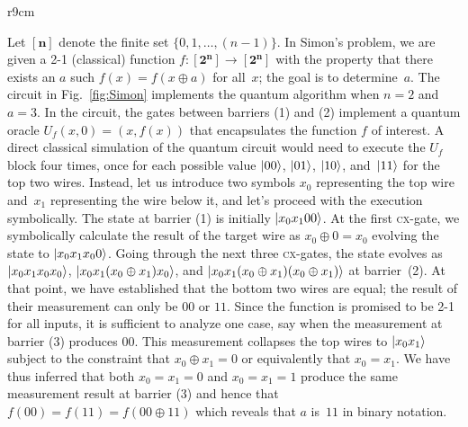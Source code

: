 \documentclass{article}
\newcommand{\cx}{\textsc{cx}}
\newcommand{\finset}[1]{[\mathbf{#1}]}
\begin{document}
\begin{refsection}
\begin{wrapfigure}{r}{9cm}
\caption{\label{fig:Simon}Circuit for Simon's Algorithm $n=2$ and $a=3$}
\end{wrapfigure}
Let $\finset{n}$ denote the finite set $\{ 0,1,\ldots,(n-1)\}$. In
Simon's problem, we are given a 2-1 (classical) function $f :
\finset{2^n} \rightarrow \finset{2^n}$ with the property that there
exists an $a$ such $f(x) = f(x \oplus a)$ for all~$x$; the goal is to
determine~$a$. The circuit in Fig.~\ref{fig:Simon} implements the
quantum algorithm when $n=2$ and $a = 3$. In the circuit, the gates
between barriers (1) and (2) implement a quantum oracle $U_f(x,0) =
(x,f(x))$ that encapsulates the function $f$ of interest. A direct
classical simulation of the quantum circuit would need to execute the
$U_f$ block four times, once for each possible value $\ket{00}$,
$\ket{01}$, $\ket{10}$, and~$\ket{11}$ for the top two wires. Instead,
let us introduce two symbols $x_0$ representing the top wire and~$x_1$
representing the wire below it, and let's proceed with the execution
symbolically. The state at barrier (1) is initially
$\ket{x_0x_100}$. At the first \cx-gate, we symbolically calculate the
result of the target wire as $x_0 \oplus 0 = x_0$ evolving the state
to $\ket{x_0x_1x_00}$. Going through the next three \cx-gates, the
state evolves as $\ket{x_0x_1x_0x_0}$, $\ket{x_0x_1(x_0\oplus
  x_1)x_0}$, and $\ket{x_0x_1(x_0\oplus x_1)(x_0\oplus x_1)}$ at
barrier~(2). At that point, we have established that the bottom two
wires are equal; the result of their measurement can only be $00$ or
$11$. Since the function is promised to be 2-1 for all inputs, it is
sufficient to analyze one case, say when the measurement at barrier
(3) produces $00$. This measurement collapses the top wires to
$\ket{x_0x_1}$ subject to the constraint that $x_0\oplus x_1 = 0$ or
equivalently that $x_0 = x_1$.  We have thus inferred that both
$x_0=x_1=0$ and $x_0=x_1=1$ produce the same measurement result at
barrier (3) and hence that $f(00) = f(11) = f(00 \oplus 11)$ which
reveals that $a$ is~$11$ in binary notation.


\end{refsection}
\end{document}
